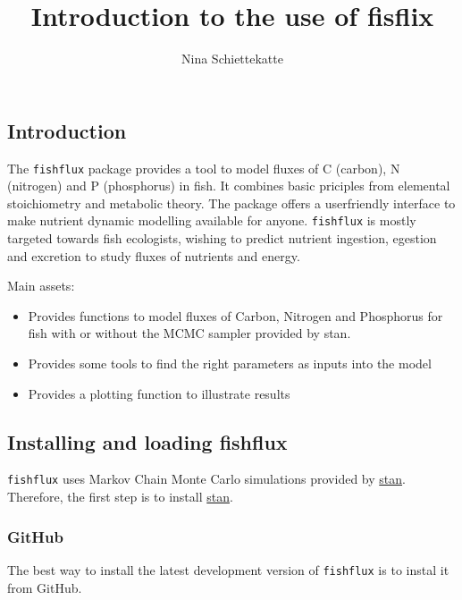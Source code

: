 \documentclass[]{article}
\title{Introduction to the use of fisflix}
\author{Nina Schiettekatte}
\date{}
\providecommand{\tightlist}{%
  \setlength{\itemsep}{0pt}\setlength{\parskip}{0pt}}
\begin{document}
\maketitle

\hypertarget{introduction}{%
\subsection{Introduction}\label{introduction}}

The \texttt{fishflux} package provides a tool to model fluxes of C
(carbon), N (nitrogen) and P (phosphorus) in fish. It combines basic
priciples from elemental stoichiometry and metabolic theory. The package
offers a userfriendly interface to make nutrient dynamic modelling
available for anyone. \texttt{fishflux} is mostly targeted towards fish
ecologists, wishing to predict nutrient ingestion, egestion and
excretion to study fluxes of nutrients and energy.

Main assets:

\begin{itemize}
\tightlist
\item
  Provides functions to model fluxes of Carbon, Nitrogen and Phosphorus
  for fish with or without the MCMC sampler provided by stan.
\item
  Provides some tools to find the right parameters as inputs into the
  model
\item
  Provides a plotting function to illustrate results
\end{itemize}

\hypertarget{installing-and-loading-fishflux}{%
\subsection{Installing and loading
fishflux}\label{installing-and-loading-fishflux}}

\texttt{fishflux} uses Markov Chain Monte Carlo simulations provided by
\href{https://github.com/stan-dev/rstan/wiki/RStan-Getting-Started}{stan}.
Therefore, the first step is to install
\href{https://github.com/stan-dev/rstan/wiki/RStan-Getting-Started}{stan}.

\hypertarget{github}{%
\subsubsection{GitHub}\label{github}}

The best way to install the latest development version of
\texttt{fishflux} is to instal it from GitHub.
\end{document}
